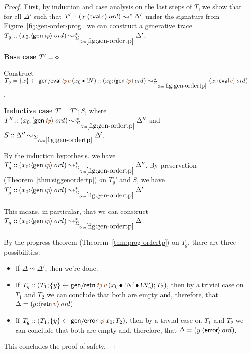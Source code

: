 \begin{proof}

  First, by induction and case analysis on the last steps of $T$, we show
  that for all $\Delta'$ such that $T' :: (x{:}\istrue{\susp{{\sf
        eval}\,\lf{e}}}) \leadsto^* \Delta'$ under the signature
  from Figure~\ref{fig:gen-order-prog}, we can construct
  a generative trace $T_g :: (x_0{:}\istrue{\susp{{\sf
        gen}\,\lf{{\it tp}}}}) \leadsto^*_{\siggenordertp} \Delta'$:

  \bigskip
  \noindent
  {\bf Base case $T' = \diamond$}.

  \smallskip
  \noindent
  Construct
  $T_g = \trstep{x}{{\sf gen/eval}\,\lf{{\it tp}}\,\lf{e}\,(\tfuser{x_0}{\tbangr{N}})}:: (x_0{:}\istrue{\susp{{\sf gen}\,\lf{{\it tp}}}})
  \leadsto^*_{\siggenordertp} (x{:}\istrue{\susp{{\sf
        eval}\,\lf{e}}})$.

  \bigskip
  \noindent
  {\bf Inductive case $T' = T''; S$}, where $T'' :: (x_0{:}\istrue{\susp{{\sf gen}\,\lf{{\it tp}}}}) \leadsto^*_{\siggenordertp} \Delta''$ and $S :: \Delta'' \leadsto_{\siggenordertp} \Delta'$. 

  \smallskip
  \noindent
  By the induction hypothesis, we have $T_g' :: (x_0{:}\istrue{\susp{{\sf gen}\,\lf{{\it tp}}}}) \leadsto_{\siggenordertp}^*
  \Delta''$. By preservation (Theorem~\ref{thm:siggenordertp}) on 
  $T_g'$ and $S$, we have $T_g' :: (x_0{:}\istrue{\susp{{\sf gen}\,\lf{{\it tp}}}}) \leadsto_{\siggenordertp}^*
  \Delta'$.

  \bigskip
  \noindent
  This means, in particular, that we can construct 
  $T_g :: (x_0{:}\istrue{\susp{{\sf gen}\,\lf{{\it tp}}}}) \leadsto_{\siggenordertp}^*
  \Delta$. 

  \bigskip
  \noindent
  By the progress theorem (Theorem~\ref{thm:prog-ordertp}) on $T_g$, 
  there are three possibilities:
  \begin{itemize}
  \item If $\Delta \leadsto \Delta'$, then we're done.
  \item If $T_g :: (T_1; \trstep{y}{{\sf gen/retn}\,\lf{{\it tp}}\,\lf{v}\,(\tfuser{x_0}{\tfuser{\tbangr{N'}}{\tbangr{N_v'}}})}; T_2)$, then by a trivial case on $T_1$ and $T_2$ we can conclude that both are empty and, therefore, that $\Delta = (y{:}\istrue{\susp{{\sf retn}\,\lf{v}}})$.
  \item If $T_g :: (T_1; \trstep{y}{{\sf gen/error}\,\lf{{\it tp}}\,x_0}; T_2)$, then by a trivial case on $T_1$ and $T_2$ we can conclude that both are empty and, therefore, that $\Delta = (y{:}{\langle {{\sf error}} \rangle}\,{{\it ord}})$.
  \end{itemize}

  \noindent
  This concludes the proof of safety.
\end{proof}